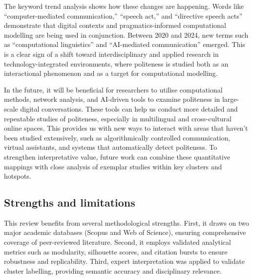 \documentclass[english]{textolivre}
\begin{document}
The keyword trend analysis shows how these changes are happening. Words like ``computer-mediated communication,'' ``speech act,'' and ``directive speech acts'' demonstrate that digital contexts and pragmatics-informed computational modelling are being used in conjunction. Between 2020 and 2024, new terms such as ``computational linguistics'' and ``AI-mediated communication'' emerged. This is a clear sign of a shift toward interdisciplinary and applied research in technology-integrated environments, where politeness is studied both as an interactional phenomenon and as a target for computational modelling.

In the future, it will be beneficial for researchers to utilise computational methods, network analysis, and AI-driven tools to examine politeness in large-scale digital conversations. These tools can help us conduct more detailed and repeatable studies of politeness, especially in multilingual and cross-cultural online spaces. This provides us with new ways to interact with areas that haven’t been studied extensively, such as algorithmically controlled communication, virtual assistants, and systems that automatically detect politeness. To strengthen interpretative value, future work can combine these quantitative mappings with close analysis of exemplar studies within key clusters and hotspots.

\subsection{Strengths and limitations}
This review benefits from several methodological strengths. First, it draws on two major academic databases (Scopus and Web of Science), ensuring comprehensive coverage of peer-reviewed literature. Second, it employs validated analytical metrics such as modularity, silhouette scores, and citation bursts to ensure robustness and replicability. Third, expert interpretation was applied to validate cluster labelling, providing semantic accuracy and disciplinary relevance.
\end{document}
